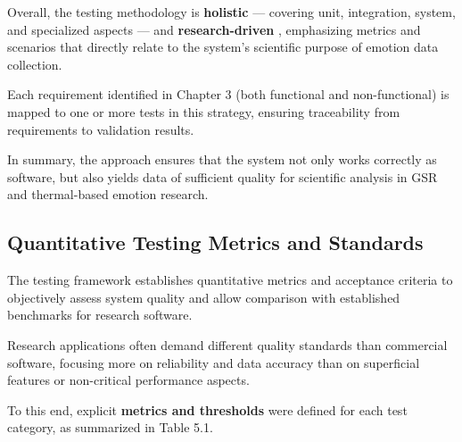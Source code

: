 Overall, the testing methodology is \textbf{holistic}
 --- covering unit, integration, system, and specialized aspects --- and \textbf{research-driven}
, emphasizing metrics and scenarios that directly relate to the system's scientific purpose of emotion data collection.

Each requirement identified in Chapter 3 (both functional and non-functional) is mapped to one or more tests in this strategy, ensuring traceability from requirements to validation results.

In summary, the approach ensures that the system not only works correctly as software, but also yields data of sufficient quality for scientific analysis in GSR and thermal-based emotion research.

\subsection{Quantitative Testing Metrics and Standards}

The testing framework establishes quantitative metrics and acceptance criteria to objectively assess system quality and allow comparison with established benchmarks for research software.

Research applications often demand different quality standards than commercial software, focusing more on reliability and data accuracy than on superficial features or non-critical performance aspects.

To this end, explicit \textbf{metrics and thresholds}
 were defined for each test category, as summarized in Table 5.1.

